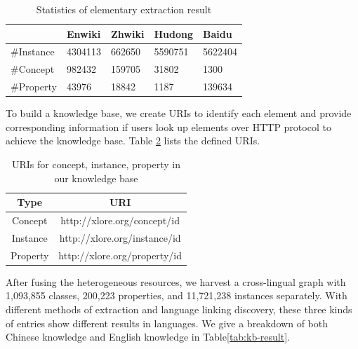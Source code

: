 \documentclass[runningheads,a4paper]{llncs}
\begin{document}
\begin{table}[h]
\small
\centering
\caption{Statistics of elementary extraction result}
\label{tab:extract-result}
    \begin{tabular}{|l|l|l|l|l|}
        \hline
                 & Enwiki  & Zhwiki & Hudong  & Baidu   \\ \hline
        #Instance & 4304113 & 662650 & 5590751 & 5622404 \\ \hline
        #Concept  & 982432  & 159705 & 31802   & 1300    \\ \hline
        #Property & 43976   & 18842  & 1187    & 139634  \\ \hline
    \end{tabular}
\end{table}

To build a knowledge base, we create URIs to identify each element and provide corresponding information if users look up elements over HTTP protocol to achieve the knowledge base. Table \ref{tab:uris} lists the defined URIs.
\begin{table}[h]
\small
\centering
\caption{URIs for concept, instance, property in our knowledge base}
\label{tab:uris}
    \begin{tabular}{|c|c|}
        \hline
        Type     & URI                          \\ \hline
        Concept  & http://xlore.org/concept/id  \\ \hline
        Instance & http://xlore.org/instance/id \\ \hline
        Property & http://xlore.org/property/id \\ \hline
    \end{tabular}
\end{table}

After fusing the heterogeneous resources, we harvest a cross-lingual graph with 1,093,855 classes, 200,223 properties, and 11,721,238 instances separately. With different methods of extraction and language linking discovery, these three kinds of entries show different results in languages. We give a breakdown of both Chinese knowledge and English knowledge in Table\ref{tab:kb-result}.
\end{document}
